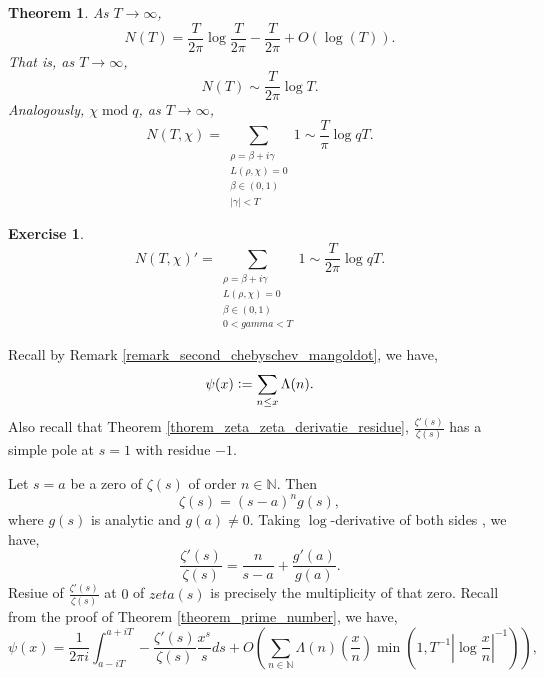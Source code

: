 \documentclass{article}
\newtheorem{theorem}{Theorem} [section]
\newtheorem{exercise}{Exercise}[section]
\DeclareMathOperator{\tmod}{mod}
\newcommand{\defeq}{\vcentcolon=}
\newcommand{\N}[0]{\mathbb{N}}
\begin{document}
\begin{theorem}
  As $T\to \infty$,
  \begin{equation*}
    N(T) = {\frac {T} {2\pi}}\log{\frac T {2\pi}}-{\frac T {2\pi}}+O(\log(T)).
  \end{equation*}
  That is, as $T\to\infty$,
  \begin{equation*}
    N(T)\sim {\frac T {2\pi}}\log T.
  \end{equation*}
  Analogously, $\chi\tmod q$, as $T\to\infty$,
  \begin{equation*}
    N(T,\chi) = \sum_{\substack{\rho=\beta+i\gamma\\L(\rho,\chi)=0\\\beta\in(0,1)\\\vert\gamma\vert<T}}1 \sim {\frac T {\pi}}\log qT.
  \end{equation*}
\end{theorem}
\begin{exercise}
  \begin{equation*}
    N(T,\chi)' = \sum_{\substack{\rho=\beta+i\gamma\\L(\rho,\chi)=0\\\beta\in(0,1)\\0<gamma<T}}1 \sim {\frac T {2\pi}}\log qT.
  \end{equation*}
\end{exercise}
Recall by Remark \ref{remark_second_chebyschev_mangoldot}, we have,
\begin{equation*}
  \psi(x) \defeq  \sum_{n\leq x}\Lambda(n).
\end{equation*}
Also recall that Theorem \ref{thorem_zeta_zeta_derivatie_residue}, ${\frac {\zeta'(s)} {\zeta(s)}}$ has a simple pole at $s=1$ with residue $-1$. 
\par Let $s=a$ be a zero of $\zeta(s)$ of order $n\in\N$. Then 
\begin{equation*}
  \zeta(s) = (s-a)^ng(s),
\end{equation*}
where $g(s)$ is analytic and $g(a)\not=0$. Taking $\log$-derivative of both sides , we have,
\begin{equation*}
  {\frac {\zeta'(s)} {\zeta(s)}} = {\frac {n} {s-a}}+{\frac {g'(a)} {g(a)}}.
\end{equation*}
Resiue of ${\frac {\zeta'(s)} {\zeta(s)}}$ at $0$ of $zeta(s)$ is precisely the multiplicity of that zero.
Recall from the proof of Theorem \ref{theorem_prime_number}, we have,
\begin{equation*}
  \psi(x) = {\frac 1 {2\pi i}}\int_{a-iT}^{a+iT}-{\frac {\zeta'(s)} {\zeta(s)}}{\frac {x^s} {s}}ds+O\left(\sum_{n\in\N}\Lambda(n)\left({\frac x n}\right)\min(1,T^{-1}\left\vert\log {\frac x n}\right\vert^{-1})\right),
\end{equation*}
\end{document}
